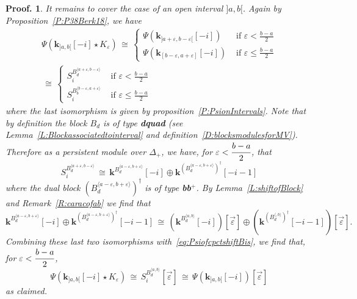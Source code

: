 \documentclass[a4paper, english, 11pt]{article}
\newcommand{\kk}[0]{\textbf{k}}
\newcommand{\0}{\vec{0}}
\newtheorem*{pf}{Proof.} }
\begin{document}
\begin{pf}
It remains to cover the case of an open interval $]a,b[$. Again by  Proposition~\ref{P:P38Berk18}, we have 
\begin{multline}\label{eq:PsiofcpctshiftBis}
 \Psi(\kk_{]a,b[}[-i] \star K_{\varepsilon}) \,\cong \,  \left\{ \begin{array}{ll}\Psi(\kk_{]a+\varepsilon,b-\varepsilon[}[-i]) & \mbox{ if }\varepsilon <\frac{b-a}{2} \\
      \Psi(\kk_{[b-\varepsilon,a+\varepsilon]}[-i]) & \mbox{ if }\varepsilon \leqslant\frac{b-a}{2} \end{array} \right .
      \\ \, \cong \, \left\{ \begin{array}{ll}S_i^{B_d^{\langle a+\varepsilon,b-\varepsilon\rangle}} & \mbox{ if }\varepsilon <\frac{b-a}{2} \\
      S_i^{B_b^{\langle b-\varepsilon,a+\varepsilon\rangle}} & \mbox{ if }\varepsilon \leqslant\frac{b-a}{2}                                                          \end{array}\right .
\end{multline} where the last isomorphism is given by proposition~\ref{P:PsionIntervals}.
Note that by definition the block $B_d$ is of type \textbf{dquad} (see Lemma~\ref{L:Blockassociatedtointerval} and definition~\ref{D:blocksmodulesforMV}). Therefore as a persistent module over $\Delta_+$, we have, for $\varepsilon < \cfrac{b-a}{2}$, that
$$S_i^{B_{d}^{\langle a+\varepsilon, b -\varepsilon\rangle}} \,\cong\, \kk^{B_{d}^{\langle a-\varepsilon, b+\varepsilon \rangle}} [-i] \oplus \kk^{(B_{d}^{\langle a-\varepsilon, b+\varepsilon \rangle})^\dagger} [-i-1]$$ where the dual block $(B_{d}^{\langle a-\varepsilon, b+\varepsilon \rangle})^\dagger$ is of type \textbf{bb}$^{+}$.  
By Lemma~\ref{L:shiftofBlock} and Remark~\ref{R:caracofab} we find that 
$$\kk^{B_{d}^{\langle a-\varepsilon, b+\varepsilon \rangle}} [-i] \oplus \kk^{(B_{d}^{\langle a-\varepsilon, b+\varepsilon \rangle})^\dagger} [-i-1] \, \cong \,(\kk^{B_{d}^{\langle a, b \rangle}} [-i])[\vec{\varepsilon}] \oplus (\kk^{(B_{d}^{\langle , b\rangle})^\dagger} [-i-1])[\vec{\varepsilon}]. $$
Combining these last two isomorphisms with~\eqref{eq:PsiofcpctshiftBis}, we find that,  for $\varepsilon < \cfrac{b-a}{2}$,
\begin{equation} \Psi(\kk_{]a,b[}[-i] \star K_{\varepsilon}) \,\cong \, S_i^{B_d^{\langle a, b\rangle}} [\vec{\varepsilon}]\, \cong \, \Psi(\kk_{]a,b[}[-i]) [\vec{\varepsilon}]
\end{equation}
as claimed.


\end{pf}
\end{document}
